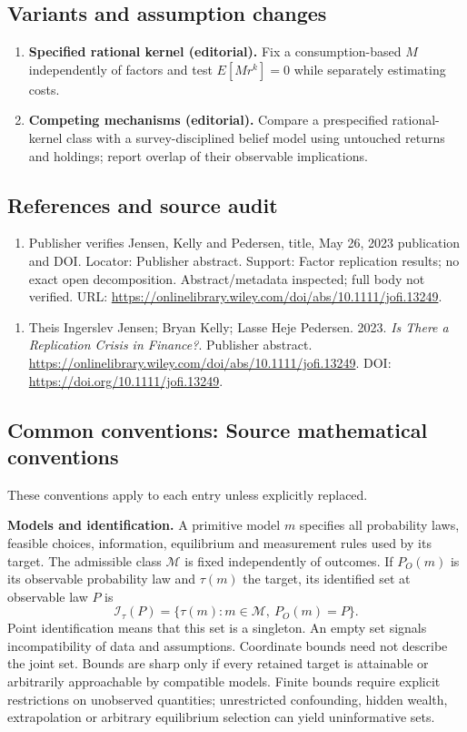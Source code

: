 \documentclass[11pt,a4paper]{article}
\begin{document}
\subsection*{Variants and assumption changes}
\begin{enumerate}
\item \textbf{Specified rational kernel (editorial).} Fix a consumption-based \(M\) independently of factors and test \(E[Mr^k]=0\) while separately estimating costs.
\item \textbf{Competing mechanisms (editorial).} Compare a prespecified rational-kernel class with a survey-disciplined belief model using untouched returns and holdings; report overlap of their observable implications.
\end{enumerate}
\subsection*{References and source audit}
\begin{enumerate}
\item Publisher verifies Jensen, Kelly and Pedersen, title, May 26, 2023 publication and DOI. Locator: Publisher abstract. Support: Factor replication results; no exact open decomposition. Abstract/metadata inspected; full body not verified. URL: \url{https://onlinelibrary.wiley.com/doi/abs/10.1111/jofi.13249}.
\end{enumerate}
\begin{enumerate}\raggedright
\item\hypertarget{definitions:source:30007596:1}{} Theis Ingerslev Jensen; Bryan Kelly; Lasse Heje Pedersen. 2023. \emph{Is There a Replication Crisis in Finance?}. Publisher abstract.
\url{https://onlinelibrary.wiley.com/doi/abs/10.1111/jofi.13249}.
DOI: \url{https://doi.org/10.1111/jofi.13249}.
\end{enumerate}

\subsection*{Common conventions: Source mathematical conventions}

These conventions apply to each entry unless explicitly replaced.

\textbf{Models and identification.} A primitive model \(m\) specifies all probability laws, feasible choices, information, equilibrium and measurement rules used by its target. The admissible class \(\mathcal M\) is fixed independently of outcomes. If \(P_O(m)\) is its observable probability law and \(\tau(m)\) the target, its identified set at observable law \(P\) is
\[
 \mathcal I_\tau(P)=\{\tau(m):m\in\mathcal M,\ P_O(m)=P\}.
\]
Point identification means that this set is a singleton. An empty set signals incompatibility of data and assumptions. Coordinate bounds need not describe the joint set. Bounds are sharp only if every retained target is attainable or arbitrarily approachable by compatible models. Finite bounds require explicit restrictions on unobserved quantities; unrestricted confounding, hidden wealth, extrapolation or arbitrary equilibrium selection can yield uninformative sets.
\end{document}
